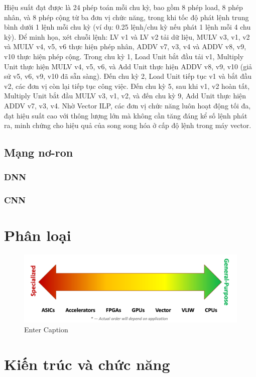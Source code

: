 \documentclass[a4paper]{article}
\begin{document}
Hiệu suất đạt được là 24 phép toán mỗi chu kỳ, bao gồm 8 phép load, 8 phép nhân, và 8 phép cộng từ ba đơn vị chức năng, trong khi tốc độ phát lệnh trung bình dưới 1 lệnh mỗi chu kỳ (ví dụ: 0.25 lệnh/chu kỳ nếu phát 1 lệnh mỗi 4 chu kỳ). Để minh họa, xét chuỗi lệnh: LV v1 và LV v2 tải dữ liệu, MULV v3, v1, v2 và MULV v4, v5, v6 thực hiện phép nhân, ADDV v7, v3, v4 và ADDV v8, v9, v10 thực hiện phép cộng. Trong chu kỳ 1, Load Unit bắt đầu tải v1, Multiply Unit thực hiện MULV v4, v5, v6, và Add Unit thực hiện ADDV v8, v9, v10 (giả sử v5, v6, v9, v10 đã sẵn sàng). Đến chu kỳ 2, Load Unit tiếp tục v1 và bắt đầu v2, các đơn vị còn lại tiếp tục công việc. Đến chu kỳ 5, sau khi v1, v2 hoàn tất, Multiply Unit bắt đầu MULV v3, v1, v2, và đến chu kỳ 9, Add Unit thực hiện ADDV v7, v3, v4. Nhờ Vector ILP, các đơn vị chức năng luôn hoạt động tối đa, đạt hiệu suất cao với thông lượng lớn mà không cần tăng đáng kể số lệnh phát ra, minh chứng cho hiệu quả của song song hóa ở cấp độ lệnh trong máy vector.

\subsection{Mạng nơ-ron}
\subsubsection{DNN}
\subsubsection{CNN}
\section{Phân loại}
\begin{figure}[H]
    \centering
    \includegraphics[width=1\linewidth]{assets/phanloai.png}
    \caption{Enter Caption}
    \label{fig:enter-label}
\end{figure}
\section{Kiến trúc và chức năng}
\end{document}
